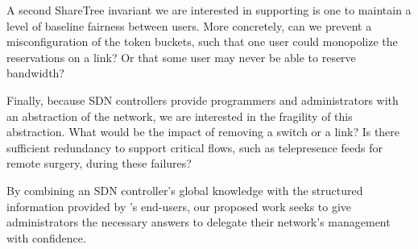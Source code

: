 A second ShareTree invariant we are interested in supporting is one to
maintain a level of baseline fairness between users. More concretely, can
we prevent a misconfiguration of the token buckets, such that one user could
monopolize the reservations on a link? Or that some user may never be able
to reserve bandwidth?

Finally, because SDN controllers provide programmers and administrators
with an abstraction of the network, we are interested in the fragility of this
abstraction. What would be the impact of removing a switch or a link? Is there
sufficient redundancy to support critical flows, such as telepresence feeds
for remote surgery, during these failures?

By combining an SDN controller's global knowledge with the structured
information provided by \sys's end-users, our proposed work seeks to give
administrators the necessary answers to delegate their network's management
with confidence.

\begin{comment}
Several previous works have explored how to prevent these configurations in 
non-participatory networks, including:
* Margrave: 
http://www.cs.brown.edu/~sk/Publications/Papers/Published/nbfdk-margrave-firewal
l/paper.pdf
* Header Space Analysis: 
https://www.usenix.org/system/files/conference/nsdi12/nsdi12-final8.pdf
* Feamster's RCC: http://nms.csail.mit.edu/papers/rcc-nsdi-camera.pdf

and could be applied to detecting bad configurations at the PolicyTree-level. 
When applied in an online fashion (that is, when a new rule is considered for 
insertion), these tools provide a type of "change-impact analysis" -- that is, 
does the impact of the change I just made agree with my intent? The key 
challenge here is to capture the user's intent in some reasonable fashion.

It's about 
running a tiny version of that impact analysis tool in the frontend to 
determine if we should accept the proposed change.  One of the cool things 
about `strict` is that it helps when there are many concurrent updates 
happening. If I read the state of the PolicyTree, decide on a rule, and set it 
with `strict`, I know that it will apply exactly as I intended. However, if 
there are have been updates which would have affected it, then the change is 
rejected; this is why `partial` may better because it will be applied either 
way.
\end{comment}
